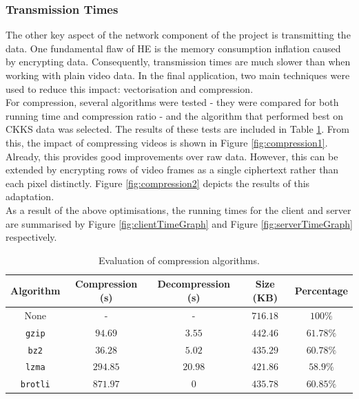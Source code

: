 \setlength{\leftskip}{0cm}
\subsubsection{Transmission Times}
\setlength{\leftskip}{0.5cm}
\indent \indent
The other key aspect of the network component of the project is transmitting the data. One fundamental flaw of HE is the memory consumption inflation caused by encrypting data. Consequently, transmission times are much slower than when working with plain video data. In the final application, two main techniques were used to reduce this impact: vectorisation and compression.
\smallskip \\ \indent
For compression, several algorithms were tested - they were compared for both running time and compression ratio - and the algorithm that performed best on CKKS data was selected. The results of these tests are included in Table \ref{tab:compression}. From this, the impact of compressing videos is shown in Figure \ref{fig:compression1}.
\smallskip \\ \indent
Already, this provides good improvements over raw data. However, this can be extended by encrypting rows of video frames as a single ciphertext rather than each pixel distinctly. Figure \ref{fig:compression2} depicts the results of this adaptation.
\smallskip \\ \indent
As a result of the above optimisations, the running times for the client and server are summarised by Figure \ref{fig:clientTimeGraph} and Figure \ref{fig:serverTimeGraph} respectively.

\begin{table}
    \centering
    \def\arraystretch{1.25}
    \begin{tabular}{|c||c|c|c|c|}
        \hline
        \textrm{\textbf{Algorithm}} & \textrm{\textbf{Compression} (s)} & \textrm{\textbf{Decompression} (s)} & \textrm{\textbf{Size} (KB)} & \textrm{\textbf{Percentage}}
        \\ \hline \hline
        \textrm{None} & - & - & $716.18$ & $100\%$
        \\ \hline
        \texttt{gzip} & $94.69$ & $3.55$ & $442.46$ & $61.78\%$
        \\ \hline
        \texttt{bz2} & $36.28$ & $5.02$ & $435.29$ & $60.78\%$
        \\ \hline
        \texttt{lzma} & $294.85$ & $20.98$ & $421.86$ & $58.9\%$
        \\ \hline
        \texttt{brotli} & $871.97$ & $0$ & $435.78$  & $60.85\%$
        \\ \hline
    \end{tabular}
    \caption[Compression algorithms]{Evaluation of compression algorithms.}
    \label{tab:compression}
\end{table}

